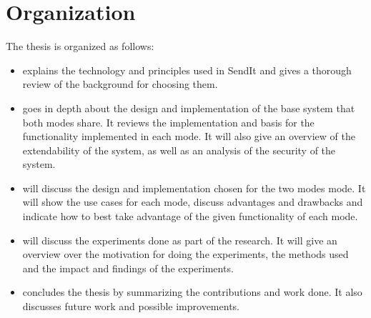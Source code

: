 \section{Organization}
%
The thesis is organized as follows:\\
\begin{itemize}
	\item {} explains the technology and principles used in SendIt and gives a thorough review of the background for choosing them.\\
	\item {} goes in depth about the design and implementation of the base system that both modes share. It reviews the implementation and basis for the functionality implemented in each mode. It will also give an overview of the extendability of the system, as well as an analysis of the security of the system.\\
	\item {} will discuss the design and implementation chosen for the two modes mode. It will show the use cases for each mode, discuss advantages and drawbacks and indicate how to best take advantage of the given functionality of each mode.\\
	\item {} will discuss the experiments done as part of the research. It will give an overview over the motivation for doing the experiments, the methods used and the impact and findings of the experiments.\\
	\item {} concludes the thesis by summarizing the contributions and work done. It also discusses future work and possible improvements.
\end{itemize}
